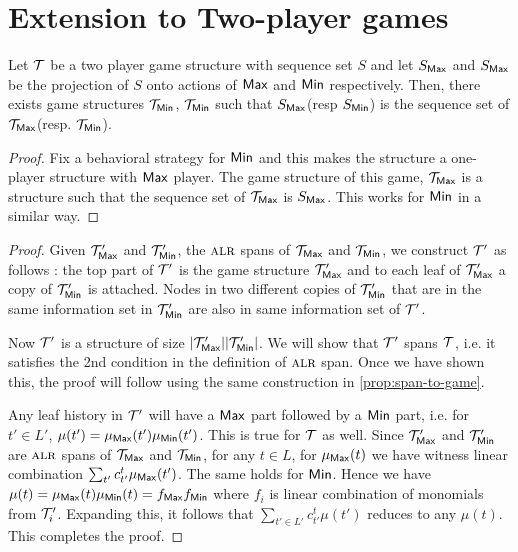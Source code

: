 \section{Extension to Two-player games}




\begin{lemma}
Let $\mathcal{T}$ be a two player game structure with sequence set $S$ and let $S_{\mathsf{Max}}$ and $S_{\mathsf{Max}}$ be the projection of $S$ onto actions of $\mathsf{Max}$ and $\mathsf{Min}$ respectively. Then, there exists game structures $\mathcal{T}_{\mathsf{Min}}$, $\mathcal{T}_{\mathsf{Min}}$ such that $S_{\mathsf{Max}}$(resp $S_{\mathsf{Min}}$) is the sequence set of $\mathcal{T}_{\mathsf{Max}}$(resp. $\mathcal{T}_{\mathsf{Min}}$).
\end{lemma}
\begin{proof}
Fix a behavioral strategy for $\mathsf{Min}$ and this makes the structure a one-player structure with $\mathsf{Max}$ player. The game structure of this game, $\mathcal{T}_{\mathsf{Max}}$ is a structure such that the sequence set of $\mathcal{T}_{\mathsf{Max}}$ is $S_{\mathsf{Max}}$. 
This works for $\mathsf{Min}$ in a similar way. 
\end{proof}
\twopPfrNam*
\begin{proof}
Given $\mathcal{T}_{\mathsf{Max}}'$ and $\mathcal{T}_{\mathsf{Min}}'$, the $\textsc{alr}$ spans of $\mathcal{T}_{\mathsf{Max}}$ and $\mathcal{T}_{\mathsf{Min}}$, we construct $\mathcal{T}'$ as follows : 
the top part of $\mathcal{T}'$ is the game structure $\mathcal{T}_{\mathsf{Max}}'$ and to each leaf of $\mathcal{T}_{\mathsf{Max}}'$ a copy of $\mathcal{T}_{\mathsf{Min}}'$ is attached. Nodes in two different copies of $\mathcal{T}_{\mathsf{Min}}'$ that are in the same information set in $\mathcal{T}_{\mathsf{Min}}'$ are also in same information set of $\mathcal{T}'$. 

Now $\mathcal{T}'$ is a structure of size $\lvert \mathcal{T}_{\mathsf{Max}}' \rvert \lvert \mathcal{T}_{\mathsf{Min}}' \rvert$. We will show that $\mathcal{T}'$ spans $\mathcal{T}$, i.e. it satisfies the 2nd condition in the definition of $\textsc{alr}$ span. Once we have shown this, the proof will follow using the same construction in \cref{prop:span-to-game}.

Any leaf history in $\mathcal{T}'$ will have a $\mathsf{Max}$ part followed by a $\mathsf{Min}$ part, i.e. for $t' \in L'$, $\mu(t') = \mu_{\mathsf{Max}}(t')\mu_{\mathsf{Min}}(t')$. This is true for $\mathcal{T}$ as well. Since $\mathcal{T}_{\mathsf{Max}}'$ and $\mathcal{T}_{\mathsf{Min}}'$ are $\textsc{alr}$ spans of $\mathcal{T}_{\mathsf{Max}}$ and $\mathcal{T}_{\mathsf{Min}}$, for any $t \in L$, for $\mu_{\mathsf{Max}}(t)$ we have witness linear combination $\sum_{t'}c^t_{t'}\mu_{\mathsf{Max}}(t')$. The same holds for $\mathsf{Min}$. Hence we have $\mu(t) = \mu_{\mathsf{Max}}(t)\mu_{\mathsf{Min}}(t) = f_{\mathsf{Max}} f_{\mathsf{Min}}$ where $f_i$ is linear combination of monomials from $\mathcal{T}'_i$. Expanding this, it follows that $\sum_{t' \in L'}c^t_{t'}\mu(t')$ reduces to any $\mu(t)$. This completes the proof.     
\end{proof}


